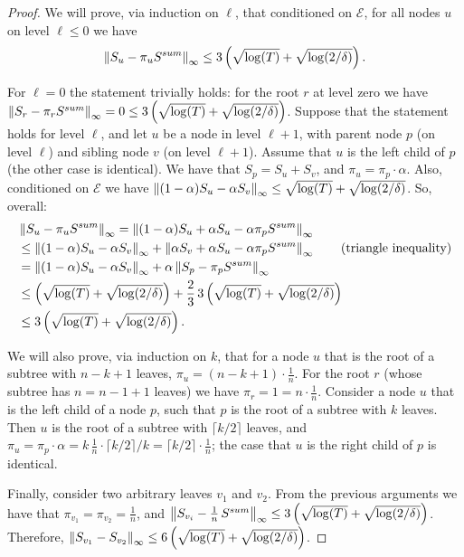 \begin{proof}
    We will prove, via induction on $\ell$, that conditioned on $\mathcal{E}$, for all nodes $u$ on level $\ell \leq 0$ we have
\[
\left\lVert S_u - \pi_u S^{sum}\right\rVert_{\infty} \leq 3 \left( \sqrt{\log(T)} + \sqrt{\log(2/ \delta)} \right).
\]

For $\ell = 0$ the statement trivially holds: for the root $r$ at level zero we have $\left\lVert S_r - \pi_r S^{sum}\right\rVert_{\infty} = 0 \leq 3 \left( \sqrt{\log(T)} + \sqrt{\log(2/ \delta)} \right)$. Suppose that the statement holds for level $\ell$, and let $u$ be a node in level $\ell + 1$, with parent node $p$ (on level $\ell$) and sibling node $v$ (on level $\ell + 1$). Assume that $u$ is the left child of $p$ (the other case is identical). We have that $S_p = S_u + S_v$, and $\pi_u = \pi_p \cdot \alpha$. Also, conditioned on $\mathcal{E}$ we have $\left\lVert (1-\alpha)S_u - \alpha S_v\right\rVert_{\infty} \leq \sqrt{\log(T)} + \sqrt{\log(2/ \delta)}$. So, overall:
\begin{align*}
    &\left\lVert S_u - \pi_u S^{sum}\right\rVert_{\infty} = \left\lVert (1-\alpha)S_u + \alpha S_u - \alpha \pi_p S^{sum}\right\rVert_{\infty} \\
    &\leq \left\lVert (1-\alpha)S_u - \alpha S_v \right\rVert_{\infty} + \left\lVert \alpha S_v + \alpha S_u - \alpha \pi_p S^{sum}\right\rVert_{\infty} \tag{triangle inequality}\\
    &= \left\lVert (1-\alpha)S_u - \alpha S_v \right\rVert_{\infty} + \alpha \left\lVert S_p - \pi_p S^{sum}\right\rVert_{\infty} \\
    &\leq \left( \sqrt{\log(T)} + \sqrt{\log(2/ \delta)} \right) + \frac{2}{3} \, 3 \left( \sqrt{\log(T)} + \sqrt{\log(2/ \delta)} \right) \\
    &\leq 3 \left( \sqrt{\log(T)} + \sqrt{\log(2/ \delta)} \right).
\end{align*}

We will also prove, via induction on $k$, that for a node $u$ that is the root of a subtree with $n-k+1$ leaves, $\pi_u = (n-k+1) \cdot \frac{1}{n}$. For the root $r$ (whose subtree has $n = n-1+1$ leaves) we have $\pi_r = 1 = n \cdot \frac{1}{n}$. Consider a node $u$ that is the left child of a node $p$, such that $p$ is the root of a subtree with $k$ leaves. Then $u$ is the root of a subtree with $\lceil k/2\rceil$ leaves, and $\pi_u = \pi_p \cdot \alpha = k \, \frac{1}{n} \cdot \lceil k/2\rceil/k = \lceil k/2\rceil \cdot \frac{1}{n}$; the case that $u$ is the right child of $p$
 is identical.

Finally, consider two arbitrary leaves $v_1$ and $v_2$. From the previous arguments we have that $\pi_{v_1} = \pi_{v_2} = \frac{1}{n}$, and $\left\lVert S_{v_i} - \frac{1}{n} \, S^{sum}\right\rVert_{\infty} \leq 3 \left( \sqrt{\log(T)} + \sqrt{\log(2/ \delta)} \right) $. Therefore, $\left\lVert S_{v_1} - S_{v_2}\right\rVert_{\infty} \leq 6 \left( \sqrt{\log(T)} + \sqrt{\log(2/ \delta)} \right)$.
\end{proof}

